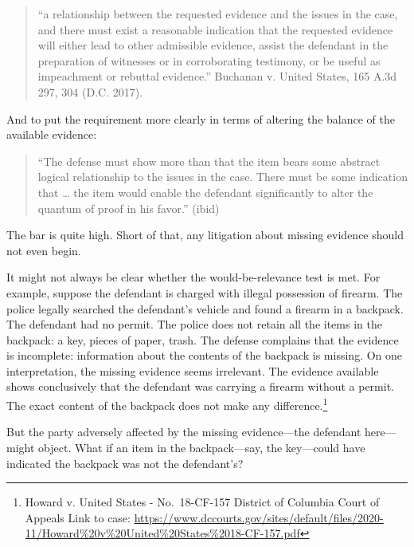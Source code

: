 \documentclass[
  10pt,
  dvipsnames,enabledeprecatedfontcommands]{scrartcl}
\begin{document}
\begin{quote}
``a relationship between the requested evidence and the issues in the
case, and there must exist a reasonable indication that the requested
evidence will either lead to other admissible evidence, assist the
defendant in the preparation of witnesses or in corroborating testimony,
or be useful as impeachment or rebuttal evidence.'' Buchanan v. United
States, 165 A.3d 297, 304 (D.C. 2017).
\end{quote}

And to put the requirement more clearly in terms of altering the balance
of the available evidence:

\begin{quote}
``The defense must show more than that the item bears some abstract
logical relationship to the issues in the case. There must be some
indication that \ldots{} the item would enable the defendant
significantly to alter the quantum of proof in his favor.'' (ibid)
\end{quote}

\noindent The bar is quite high. Short of that, any litigation about
missing evidence should not even begin.

It might not always be clear whether the would-be-relevance test is met.
For example, suppose the defendant is charged with illegal possession of
firearm. The police legally searched the defendant's vehicle and found a
firearm in a backpack. The defendant had no permit. The police does not
retain all the items in the backpack: a key, pieces of paper, trash. The
defense complains that the evidence is incomplete: information about the
contents of the backpack is missing. On one interpretation, the missing
evidence seems irrelevant. The evidence available shows conclusively
that the defendant was carrying a firearm without a permit. The exact
content of the backpack does not make any difference.\footnote{Howard v.
  United States - No.~18-CF-157 District of Columbia Court of Appeals
  Link to case:
  \url{https://www.dccourts.gov/sites/default/files/2020-11/Howard\%20v\%20United\%20States\%2018-CF-157.pdf}}

But the party adversely affected by the missing evidence---the defendant
here---might object. What if an item in the backpack---say, the
key---could have indicated the backpack was not the defendant's?
\end{document}
